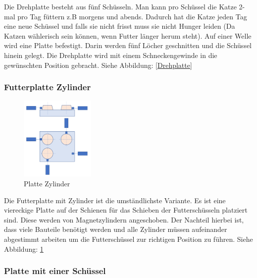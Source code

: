 Die Drehplatte besteht aus fünf Schüsseln. Man kann pro Schüssel die Katze 2-mal pro Tag füttern z.B morgens und abends. Dadurch hat die Katze jeden Tag eine neue Schüssel und falls sie nicht frisst muss sie nicht Hunger leiden (Da Katzen wählerisch sein können, wenn Futter länger herum steht). Auf einer Welle wird eine Platte befestigt. 
Darin werden fünf Löcher geschnitten und die Schüssel hinein gelegt. Die Drehplatte wird mit einem Schneckengewinde in die gewünschten Position gebracht. Siehe Abbildung: \ref{Drehplatte} 

\subsubsection{Futterplatte Zylinder}

\begin{figure}
\vspace{-20pt}
  \begin{center}
    \includegraphics[width=0.32\textwidth]{Bilder/Powerpoint/Platte_Zylinder}
  \end{center}
  \caption{Platte Zylinder}
  \label{Platte Zylinder}
\vspace{-60pt}
\end{figure}

Die Futterplatte mit Zylinder ist die umständlichste Variante. Es ist eine viereckige Platte auf der Schienen für das Schieben der Futterschüsseln platziert sind. Diese werden von Magnetzylindern angeschoben. Der Nachteil hierbei ist, dass viele Bauteile benötigt werden und alle Zylinder müssen aufeinander abgestimmt arbeiten um die Futterschüssel zur richtigen Position zu führen. Siehe Abbildung: \ref{Platte Zylinder} 

\newpage


\subsubsection{Platte mit einer Schüssel}

